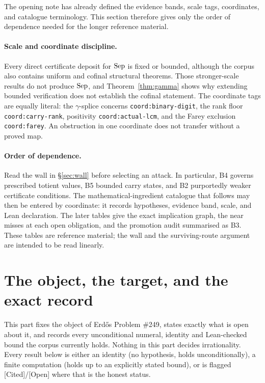 \documentclass[11pt]{article}
\theoremstyle{plain}
\theoremstyle{definition}
\theoremstyle{remark}
\let\origmathrm\mathrm
\renewcommand{\mathrm}[1]{\ifmmode\origmathrm{#1}\else\textrm{#1}\fi}%
\newcommand{\ev}[1]{{\small\textsf{[#1]}}\xspace}
\newcommand{\coord}[1]{\texorpdfstring{{\small\nolinkurl{coord:#1}}}{coord:#1}\xspace}
\begin{document}
The opening note has already defined the evidence bands, scale tags,
coordinates, and catalogue terminology.  This section therefore gives only
the order of dependence needed for the longer reference material.

\paragraph{Scale and coordinate discipline.} Every direct certificate deposit
for $\mathrm{Sep}$ is fixed or bounded, although the corpus also contains
uniform and cofinal structural theorems.  Those stronger-scale results do not
produce $\mathrm{Sep}$, and Theorem~\ref{thm:gamma} shows why extending bounded
verification does not establish the cofinal statement.  The coordinate tags
are equally literal: the $\gamma$-splice concerns \coord{binary-digit}, the
rank floor \coord{carry-rank}, positivity \coord{actual-lcm}, and the Farey
exclusion \coord{farey}.  An obstruction in one coordinate does not transfer
without a proved map.

\paragraph{Order of dependence.} Read the wall in \S\ref{sec:wall} before
selecting an attack.  In particular, B4 governs prescribed totient values, B5
bounded carry states, and B2 purportedly weaker certificate conditions.  The
mathematical-ingredient catalogue that follows may then be entered by
coordinate: it records hypotheses, evidence band, scale, and Lean declaration.
The later tables give the exact implication graph, the near misses at each open
obligation, and the promotion audit summarised as B3.  These tables are
reference material; the wall and the surviving-route argument are intended to
be read linearly.
\section{The object, the target, and the exact record}

This part fixes the object of Erd\H{o}s Problem \#249, states exactly what is
open about it, and records every unconditional numeral, identity and
Lean-checked bound the corpus currently holds. Nothing in this part decides
irrationality. Every result below is either an identity (no hypothesis, holds
unconditionally), a finite computation (holds up to an explicitly stated
bound), or is flagged \ev{Cited}/\ev{Open} where that is the honest status.
\end{document}
